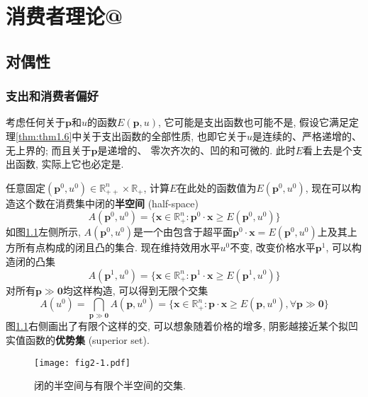 \documentclass[cn, 12pt, math=mtpro2, bibstyle=apa, blue, twocol]{elegantbook}
\makeatletter
\newcommand*{\rom}[1]{\expandafter\@slowromancap\romannumeral #1@}
\newcommand{\R}{\mathbb{R}}
\newcommand{\p}{\mathbf{p}}
\newcommand{\x}{\mathbf{x}}
\makeatother
\begin{document}
\chapter{消费者理论\rom{2}}
\section{对偶性}
\subsection{支出和消费者偏好}
考虑任何关于$\p$和$u$的函数$E(\p,u)$, 它可能是支出函数也可能不是, 假设它满足定理\ref{thm:thm1.6}中关于支出函数的全部性质, 也即它关于$u$是连续的、严格递增的、无上界的; 而且关于$\p$是递增的、 零次齐次的、凹的和可微的. 此时$E$看上去是个支出函数, 实际上它也必定是.

任意固定$(\p^0,u^0)\in\R_{++}^n\times\R_+$, 计算$E$在此处的函数值为$E(\p^0,u^0)$, 现在可以构造这个数在消费集中闭的\textbf{半空间} (half-space)
$$A(\p^0,u^0)=\{\x\in\R_+^n: \p^0\cdot\x\ge E(\p^0,u^0)\}$$
如图\ref{fig2.1}左侧所示, $A(\p^0,u^0)$是一个由包含于超平面$\p^0\cdot\x=E(\p^0,u^0)$上及其上方所有点构成的闭且凸的集合. 现在维持效用水平$u^0$不变, 改变价格水平$\p^1$, 可以构造闭的凸集
$$A(\p^1,u^0)=\{\x\in\R_+^n: \p^1\cdot\x\ge E(\p^1,u^0)\}$$
对所有$\p\gg\mathbf{0}$均这样构造, 可以得到无限个交集
\begin{equation}\label{eq2.1}
  A(u^0)=\bigcap_{\p\gg\mathbf{0}}A(\p,u^0)=\{\x\in\R_+^n: \p\cdot\x\ge E(\p,u^0),\forall\p\gg\mathbf{0}\}
\end{equation}
图\ref{fig2.1}右侧画出了有限个这样的交, 可以想象随着价格的增多, 阴影越接近某个拟凹实值函数的\textbf{优势集} (superior set).
\begin{figure}[htbp!]
  \centering
  \texttt{[image: fig2-1.pdf]}
  \caption{闭的半空间与有限个半空间的交集.}\label{fig2.1}
\end{figure}
\end{document}

